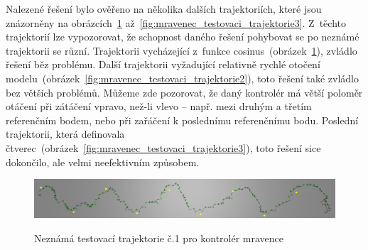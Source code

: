 Nalezené řešení bylo ověřeno na několika dalších trajektoriích, které jsou znázorněny na obrázcích~\ref{fig:mravenec_testovaci_trajektorie1} až~\ref{fig:mravenec_testovaci_trajektorie3}.
Z~těchto trajektorií lze vypozorovat, že schopnost daného řešení pohybovat se po neznámé trajektorii se různí.
Trajektorii vycházející z~funkce cosinus~(obrázek~\ref{fig:mravenec_testovaci_trajektorie1}), zvládlo řešení běz problému.
Další trajektorii vyžadující relativně rychlé otočení modelu~(obrázek~\ref{fig:mravenec_testovaci_trajektorie2}), toto řešení také zvládlo bez větších problémů.
Můžeme zde pozorovat, že daný kontrolér má větší poloměr otáčení při zátáčení vpravo, než-li vlevo -- např. mezi druhým a třetím referenčním bodem, nebo při zařáčení k poslednímu referenčnímu bodu.
Poslední trajektorii, která definovala čtverec~(obrázek~\ref{fig:mravenec_testovaci_trajektorie3}), toto řešení sice dokončilo, ale velmi neefektivním způsobem.


\begin{figure}[h]
    \centering
    {\includegraphics[width=\linewidth]{obrazky/mravenec_testovaci_trajektorie1.png}}
    \caption{
    Neznámá testovací trajektorie č.1 pro kontrolér mravence
    }
    \label{fig:mravenec_testovaci_trajektorie1}
\end{figure}


